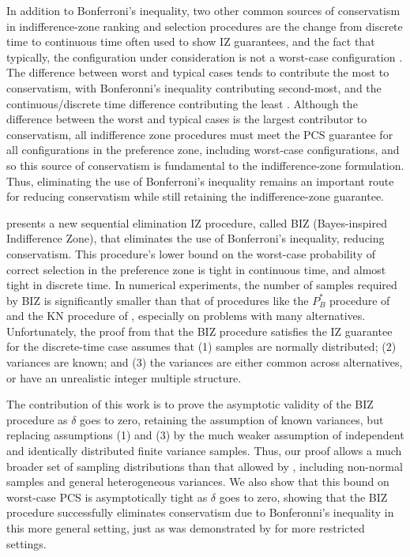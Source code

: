 \documentclass{wscpaperproc}
\theoremstyle{wsc}
\begin{document}
In addition to Bonferroni's inequality, two other common sources of conservatism in indifference-zone ranking and selection procedures are the change from discrete time to continuous time often used to show IZ guarantees, and the fact that typically, the configuration under consideration is not a worst-case configuration \cite{Kim:Conserv}.  The difference between worst and typical cases tends to contribute the most to conservatism, with Bonferonni's inequality contributing second-most, and the continuous/discrete time difference contributing the least \cite{Kim:Conserv}.
Although the difference between the worst and typical cases is the largest contributor to conservatism, all indifference zone procedures must meet the PCS guarantee for all configurations in the preference zone, including worst-case configurations, and so this source of conservatism is fundamental to the indifference-zone formulation.  Thus, eliminating the use of Bonferroni's inequality remains an important route for reducing conservatism while still retaining the indifference-zone guarantee.


 presents a new sequential elimination
IZ procedure, called BIZ (Bayes-inspired Indifference Zone), 
that eliminates the use of Bonferroni's inequality, reducing conservatism. 
This procedure's lower bound on the worst-case probability of correct selection in the
preference zone is tight in continuous time, and almost tight in discrete time. In numerical experiments, the number of samples required
by BIZ is significantly smaller than that of procedures like the ${P}_{B}^{*}$ procedure of  and the KN procedure of , especially on problems with many alternatives. Unfortunately, the
proof from  that the BIZ procedure satisfies the IZ guarantee for the discrete-time case assumes that (1) samples are normally distributed; 
(2) variances are known;
and (3) the variances are either common across alternatives, or have an unrealistic integer multiple structure.

The contribution of this work is to prove the asymptotic validity of the BIZ procedure as $\delta$ goes to zero, retaining the assumption of known variances, but replacing assumptions (1) and (3) by the much weaker assumption of independent and identically distributed finite variance samples.  Thus, our proof allows a much broader set of sampling distributions than that allowed by , including non-normal samples and general heterogeneous variances. 
We also show that this bound on worst-case PCS is asymptotically tight as $\delta$ goes to zero, 
showing that the BIZ procedure successfully eliminates conservatism due to Bonferonni's inequality in this more general setting, just as was demonstrated by  for more restricted settings.
\end{document}
